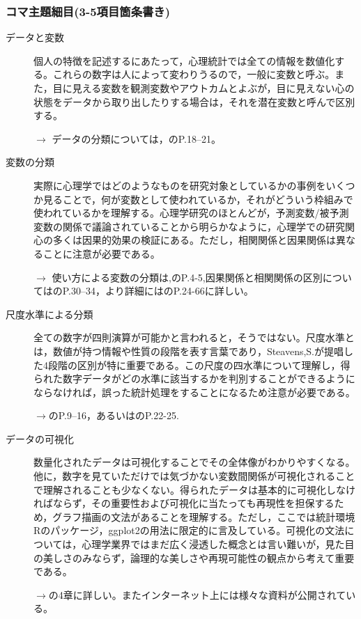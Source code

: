 \subsubsection{コマ主題細目(3-5項目箇条書き)}
\begin{description}
\item[データと変数] 個人の特徴を記述するにあたって，心理統計では全ての情報を数値化する。これらの数字は人によって変わりうるので，一般に変数と呼ぶ。また，目に見える変数を観測変数やアウトカムとよぶが，目に見えない心の状態をデータから取り出したりする場合は，それを潜在変数と呼んで区別する。
\begin{flushright}
    $\to$ データの分類については，\citet{Yamada2004}のP.18--21。
\end{flushright}

\item[変数の分類] 実際に心理学ではどのようなものを研究対象としているかの事例をいくつか見ることで，何が変数として使われているか，それがどういう枠組みで使われているかを理解する。心理学研究のほとんどが，予測変数/被予測変数の関係で議論されていることから明らかなように，心理学での研究関心の多くは因果的効果の検証にある。ただし，相関関係と因果関係は異なることに注意が必要である。
\begin{flushright}
    $\to$ 使い方による変数の分類は,\citet{山内201001}のP.4-5,因果関係と相関関係の区別については\citet{三浦201705}のP.30--34，より詳細には\citet{豊田1992}のP.24-66に詳しい。
\end{flushright}

\item[尺度水準による分類] 全ての数字が四則演算が可能かと言われると，そうではない。尺度水準とは，数値が持つ情報や性質の段階を表す言葉であり，Steavens,S.が提唱した4段階の区別が特に重要である。この尺度の四水準について理解し，得られた数字データがどの水準に該当するかを判別することができるようにならなければ，誤った統計処理をすることになるため注意が必要である。
\begin{flushright}
    $\to$\citet{川端201408}のP.9--16，あるいは\citet{Yamada2004}のP.22-25.
\end{flushright}

\item[データの可視化] 数量化されたデータは可視化することでその全体像がわかりやすくなる。他に，数字を見ていただけでは気づかない変数間関係が可視化されることで理解されることも少なくない。得られたデータは基本的に可視化しなければならず，その重要性および可視化に当たっても再現性を担保するため，グラフ描画の文法があることを理解する。ただし，ここでは統計環境Rのパッケージ，ggplot2の用法に限定的に言及している。可視化の文法については，心理学業界ではまだ広く浸透した概念とは言い難いが，見た目の美しさのみならず，論理的な美しさや再現可能性の観点から考えて重要である。
\begin{flushright}
    $\to$\citet{紀ノ定201806}の4章に詳しい。またインターネット上には様々な資料が公開されている。
\end{flushright}


\end{description}
